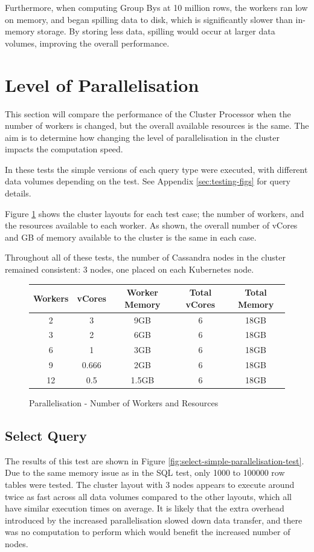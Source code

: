 Furthermore, when computing Group Bys at 10 million rows, the workers ran low on memory, and began spilling data to disk, which is significantly slower than in-memory storage. By storing less data, spilling would occur at larger data volumes, improving the overall performance.



\section{Level of Parallelisation}\label{sec:parallelisation-test}
This section will compare the performance of the Cluster Processor when the number of workers is changed, but the overall available resources is the same. The aim is to determine how changing the level of parallelisation in the cluster impacts the computation speed. 

In these tests the simple versions of each query type were executed, with different data volumes depending on the test. See Appendix \ref{sec:testing-figs} for query details. 

Figure \ref{fig:parallelisation-test-workers} shows the cluster layouts for each test case; the number of workers, and the resources available to each worker. As shown, the overall number of vCores and GB of memory available to the cluster is the same in each case. 

Throughout all of these tests, the number of Cassandra nodes in the cluster remained consistent: 3 nodes, one placed on each Kubernetes node.

\begin{figure}[ht]
	\centering
	\begin{tabular}{| c | c | c | c | c |}
		\hline
		\textbf{Workers} & \textbf{vCores} & \textbf{Worker Memory} & \textbf{Total vCores} & \textbf{Total Memory} \\ \hline
		2 & 3 & 9GB & 6 & 18GB \\ \hline
		3 & 2 & 6GB & 6 & 18GB \\ \hline
		6 & 1 & 3GB & 6 & 18GB \\ \hline
		9 & 0.666 & 2GB & 6 & 18GB \\ \hline
		12 & 0.5 & 1.5GB & 6 & 18GB \\ \hline
	\end{tabular}
	\caption{Parallelisation - Number of Workers and Resources}
	\label{fig:parallelisation-test-workers}
\end{figure}

\pagebreak
\subsection{Select Query}
The results of this test are shown in Figure \ref{fig:select-simple-parallelisation-test}. Due to the same memory issue as in the SQL test, only 1000 to 100000 row tables were tested. The cluster layout with 3 nodes appears to execute around twice as fast across all data volumes compared to the other layouts, which all have similar execution times on average. It is likely that the extra overhead introduced by the increased parallelisation slowed down data transfer, and there was no computation to perform which would benefit the increased number of nodes. 

